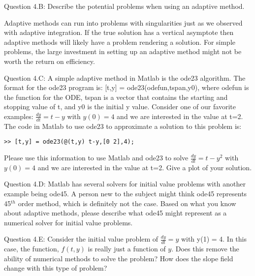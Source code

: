 \documentclass{article}
\def\ds{\displaystyle}
\begin{document}
\medskip \par \noindent
%
Question 4.B: Describe the potential problems when using an adaptive method. 

{\color{teal} Adaptive methods can run into problems with singularities just as we observed with adaptive integration. If the true solution has a vertical asymptote then adaptive methods will likely have a problem rendering a solution. For simple problems, the large investment in setting up an adaptive method might not be worth the return on efficiency. } 
  \medskip \par \noindent
%
Question 4.C: A simple adaptive method in Matlab is the ode23 algorithm. The format for the ode23 program is: [t,y] = ode23(odefun,tspan,y0), where odefun is the function for the ODE, tspan is a vector that contains the starting and stopping value of t, and y0 is the initial y value. Consider one of our favorite examples: $\ds \frac {dy}{dt}=t-y$ with $\ds y(0)=4$ and we are interested in the value at t=2. The code in Matlab to use ode23 to approximate a solution to this problem is:
\begin{verbatim}
>> [t,y] = ode23(@(t,y) t-y,[0 2],4);    
\end{verbatim}
Please use this information to use Matlab and ode23 to solve $\ds \frac {dy}{dt}=t-y^2$ with $\ds y(0)=4$ and we are interested in the value at t=2. Give a plot of your solution. 
\medskip \par \noindent
%
Question 4.D: Matlab has several solvers for initial value problems with another example being ode45. A person new to the subject might think ode45 represents 45$^{th}$ order method, which is definitely not the case. Based on what you know about adaptive methods, please describe what ode45 might represent as a numerical solver for initial value problems.   

\medskip \par \noindent
Question 4.E: Consider the initial value problem of $\ds \frac {dy}{dt} = y$ with y(1) = 4. In this case, the function, $f(t,y)$ is really just a function of $y$. Does this remove the ability of numerical methods to solve the problem? How does the slope field change with this type of problem? 
\end{document}
